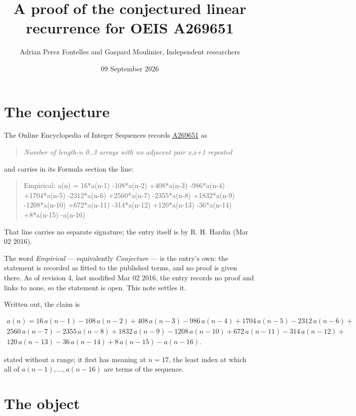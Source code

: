 \documentclass[11pt]{article}
\title{A proof of the conjectured linear recurrence for OEIS A269651}
\author{Adrian Perez Fontelles and Gaspard Moulinier, Independent researchers}
\date{09 September 2026}
\theoremstyle{definition}
\begin{document}
\maketitle
\section{The conjecture}

The Online Encyclopedia of Integer Sequences records \href{https://oeis.org/A269651}{A269651} as

\begin{quote}\itshape Number of length-n 0..3 arrays with no adjacent pair x,x+1 repeated\end{quote}

and carries in its Formula section the line:

\begin{quote}\ttfamily Empirical: a(n) = 16*a(n-1) -108*a(n-2) +408*a(n-3) -986*a(n-4) +1704*a(n-5) -2312*a(n-6) +2560*a(n-7) -2355*a(n-8) +1832*a(n-9) -1208*a(n-10) +672*a(n-11) -314*a(n-12) +120*a(n-13) -36*a(n-14) +8*a(n-15) -a(n-16)\end{quote}

That line carries no separate signature; the entry itself is by R. H. Hardin (Mar 02 2016).

The word {\itshape Empirical} --- equivalently {\itshape Conjecture} --- is the entry's own: the statement is recorded as fitted to the published terms, and no proof is given there. As of revision 4, last modified Mar 02 2016, the entry records no proof and links to none, so the statement is open. This note settles it.

Written out, the claim is

\begin{multline*} a(n) = 16\,a(n-1) - 108\,a(n-2) + 408\,a(n-3) - 986\,a(n-4) + 1704\,a(n-5) - 2312\,a(n-6) + \\ 2560\,a(n-7) - 2355\,a(n-8) + 1832\,a(n-9) - 1208\,a(n-10) + 672\,a(n-11) - 314\,a(n-12) + \\ 120\,a(n-13) - 36\,a(n-14) + 8\,a(n-15) - a(n-16). \end{multline*}

stated without a range; it first has meaning at $n = 17$, the least index at which all of $a(n-1),\dots,a(n-16)$ are terms of the sequence.

\section{The object}
\end{document}
